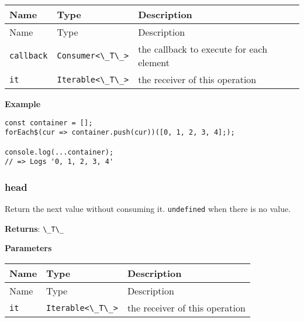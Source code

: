 \begin{longtable}[]{
  >{\raggedright\arraybackslash}p{}
  >{\raggedright\arraybackslash}p{}
  >{\raggedright\arraybackslash}p{}@{}}

\toprule\noalign{}
Name & Type & Description \\
\midrule\noalign{}
\endfirsthead
\toprule\noalign{}
Name & Type & Description \\
\midrule\noalign{}
\endhead
\bottomrule\noalign{}
\endlastfoot
\passthrough{\lstinline!callback!} &
\passthrough{\lstinline!Consumer<\_T\_>!} & the callback to execute for
each element \\
\passthrough{\lstinline!it!} & \passthrough{\lstinline!Iterable<\_T\_>!}
& the receiver of this operation \\
\end{longtable}

\textbf{Example}

\begin{lstlisting}[label=b489cddb-c6bb-4f87-9424-e1eca34f483b]
const container = [];
forEach$(cur => container.push(cur))([0, 1, 2, 3, 4];);
                                              
console.log(...container);
// => Logs '0, 1, 2, 3, 4'
\end{lstlisting}

\hypertarget{63acb1d6-3cf2-483f-9d14-aff83ac9fa7b}{%
\subsubsection{head}\label{63acb1d6-3cf2-483f-9d14-aff83ac9fa7b}}

Return the next value without consuming it.
\passthrough{\lstinline!undefined!} when there is no value.

\textbf{Returns}: \passthrough{\lstinline!\_T\_!}

\textbf{Parameters}

\begin{longtable}[]{
  >{\raggedright\arraybackslash}p{}
  >{\raggedright\arraybackslash}p{}
  >{\raggedright\arraybackslash}p{}@{}}

\toprule\noalign{}
Name & Type & Description \\
\midrule\noalign{}
\endfirsthead
\toprule\noalign{}
Name & Type & Description \\
\midrule\noalign{}
\endhead
\bottomrule\noalign{}
\endlastfoot
\passthrough{\lstinline!it!} & \passthrough{\lstinline!Iterable<\_T\_>!}
& the receiver of this operation \\
\end{longtable}

